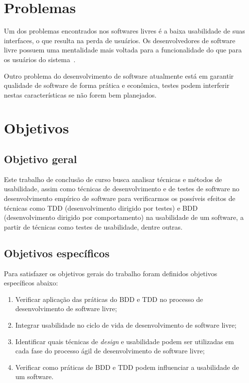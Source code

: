  

\section{Problemas}

Um dos problemas encontrados nos softwares livres é a baixa usabilidade de suas interfaces, o que resulta na perda de usuários. 
%
Os desenvolvedores de software livre possuem uma mentalidade mais voltada para a funcionalidade do que para os usuários do sistema~\cite{santos2012}. 

Outro problema do desenvolvimento de software atualmente está em garantir qualidade de software de forma prática e econômica, testes podem interferir nestas características se não forem bem planejados.

\section{Objetivos}

\subsection{Objetivo geral}
	 
Este trabalho de conclusão de curso busca analisar técnicas e métodos de usabilidade, assim como técnicas de desenvolvimento e de testes de software no desenvolvimento empírico de software para verificarmos os possíveis efeitos de técnicas como TDD (desenvolvimento dirigido por testes) e BDD (desenvolvimento dirigido por comportamento) na usabilidade de um software, a partir de técnicas como testes de usabilidade, dentre outras.

	 
\subsection{Objetivos específicos}

Para satisfazer os objetivos gerais do trabalho foram definidos objetivos específicos abaixo:

\begin{enumerate}
\item Verificar aplicação das práticas do BDD e TDD no processo de desenvolvimento de software livre;

\item Integrar usabilidade no ciclo de vida de desenvolvimento de software livre;
\item Identificar quais técnicas de \emph{design} e usabilidade  podem ser utilizadas em cada fase do processo ágil de desenvolvimento de software livre;
\item Verificar como práticas de BDD e TDD podem influenciar a usabilidade de um software.


\end{enumerate}

